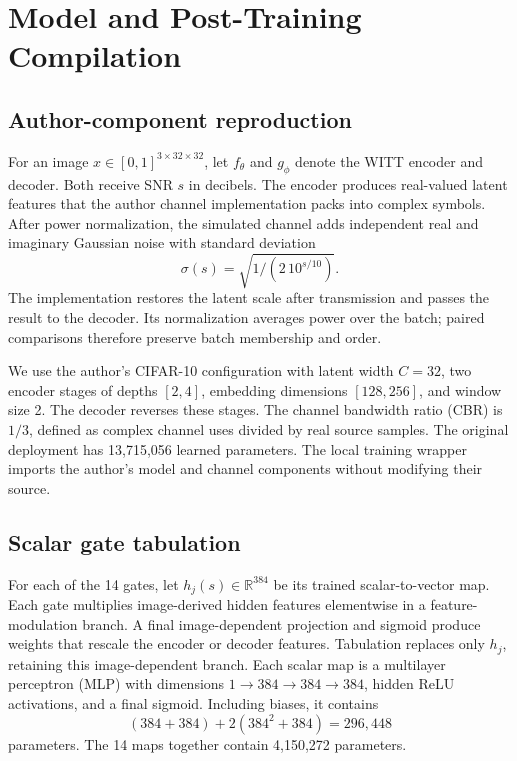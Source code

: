 \section{Model and Post-Training Compilation}
\subsection{Author-component reproduction}
For an image $x\in[0,1]^{3\times32\times32}$, let $f_\theta$ and $g_\phi$ denote the WITT encoder and decoder. Both receive SNR $s$ in decibels. The encoder produces real-valued latent features that the author channel implementation packs into complex symbols. After power normalization, the simulated channel adds independent real and imaginary Gaussian noise with standard deviation
\begin{equation}
 \sigma(s)=\sqrt{1/(2\,10^{s/10})}.
\end{equation}
The implementation restores the latent scale after transmission and passes the result to the decoder. Its normalization averages power over the batch; paired comparisons therefore preserve batch membership and order.

We use the author's CIFAR-10 configuration with latent width $C=32$, two encoder stages of depths $[2,4]$, embedding dimensions $[128,256]$, and window size 2. The decoder reverses these stages. The channel bandwidth ratio (CBR) is $1/3$, defined as complex channel uses divided by real source samples. The original deployment has 13,715,056 learned parameters. The local training wrapper imports the author's model and channel components without modifying their source.

\subsection{Scalar gate tabulation}
For each of the 14 gates, let $h_j(s)\in\mathbb{R}^{384}$ be its trained scalar-to-vector map. Each gate multiplies image-derived hidden features elementwise in a feature-modulation branch. A final image-dependent projection and sigmoid produce weights that rescale the encoder or decoder features. Tabulation replaces only $h_j$, retaining this image-dependent branch. Each scalar map is a multilayer perceptron (MLP) with dimensions $1\to384\to384\to384$, hidden ReLU activations, and a final sigmoid. Including biases, it contains
\begin{equation}
 (384+384)+2(384^2+384)=296{,}448
\end{equation}
parameters. The 14 maps together contain 4,150,272 parameters.


